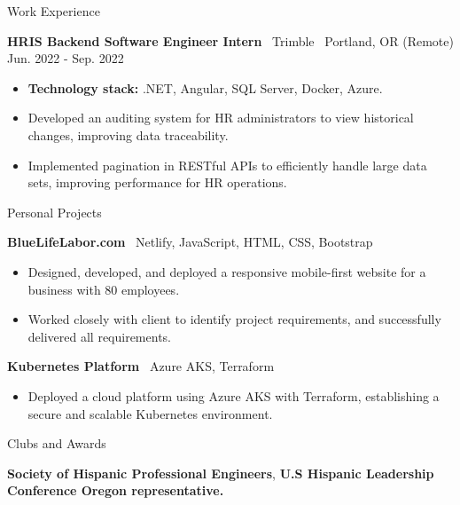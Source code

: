 \documentclass[5pt]{resume}
\begin{document}
\begin{rSection}{Work Experience}
    \item \textbf{HRIS Backend Software Engineer Intern} \textbar\ Trimble  \textbar\ Portland, OR (Remote) \hfill Jun. 2022 - Sep. 2022
    \begin{itemize}[leftmargin=0.15in]
        \item \textbf{Technology stack:} .NET, Angular, SQL Server, Docker, Azure.
        \item Developed an auditing system for HR administrators to view historical changes, improving data traceability.
        \item Implemented pagination in RESTful APIs to efficiently handle large data sets, improving performance for HR operations.
    \end{itemize}

    
\end{rSection}

\begin{rSection}{Personal Projects}
    \item \textbf{BlueLifeLabor.com} \textbar\ Netlify, JavaScript, HTML, CSS, Bootstrap
    \begin{itemize}[leftmargin=0.15in]
        \item Designed, developed, and deployed a responsive mobile-first website for a business with 80 employees. 
        \item Worked closely with client to identify project requirements, and successfully delivered all requirements. 
    \end{itemize}
    \item \textbf{Kubernetes Platform} \textbar\ Azure AKS, Terraform
    \begin{itemize}[leftmargin=0.15in]
        \item Deployed a cloud platform using Azure AKS with Terraform, establishing a secure and scalable Kubernetes environment.
    \end{itemize}

\end{rSection}  
\begin{rSection}{Clubs and Awards}
    \item \textbf{Society of Hispanic Professional Engineers}, \textbf{U.S Hispanic Leadership Conference Oregon representative.}
\end{rSection}
\end{document}
